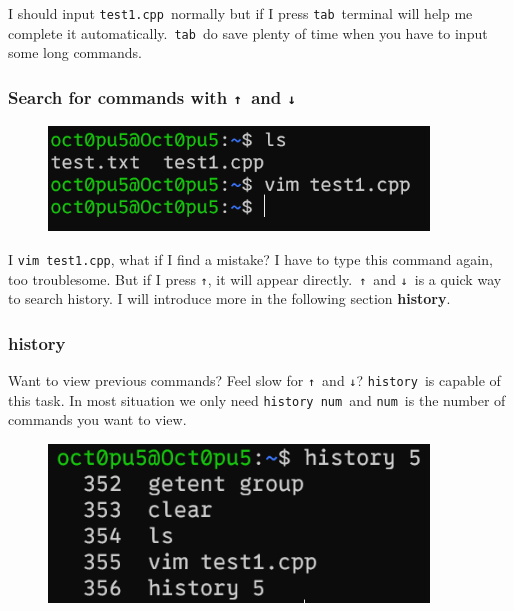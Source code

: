 \documentclass[12pt]{ctexart}
\begin{document}
I should input \texttt{test1.cpp}\ normally but if I press \texttt{tab}\
terminal will help me complete it automatically.\ \texttt{tab}\ do save
plenty of time when you have to input some long commands.

\subsubsection{\textbf{Search for commands with \texttt{↑}\ and
\texttt{↓}}}


\begin{figure}[H]
    \centering
    \includegraphics[width=0.9\textwidth,keepaspectratio]{assets/Linux/1.7 Tricks for a real Linuxer/3.png}
\end{figure}

I \texttt{vim\ test1.cpp}, what if I find a mistake? I have to type this
command again, too troublesome. But if I press \texttt{↑}, it will
appear directly.\ \texttt{↑}\ and \texttt{↓}\ is a quick way to search
history. I will introduce more in the following section
\textbf{history}.

\subsubsection{\textbf{history}}

Want to view previous commands? Feel slow for \texttt{↑}\ and \texttt{↓}?
\texttt{history}\ is capable of this task. In most situation we only need
\texttt{history\ num}\ and \texttt{num}\ is the number of commands you
want to view.

\begin{figure}[H]
    \centering
    \includegraphics[width=0.9\textwidth,keepaspectratio]{assets/Linux/1.7 Tricks for a real Linuxer/4.png}
\end{figure}
\end{document}
